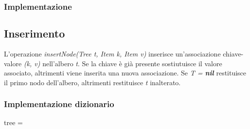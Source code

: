 \subsubsection{Implementazione}
\begin{multicols}{2}
\begin{algorithm}[H]
\DontPrintSemicolon
{}
\caption{\protect{}}
\end{algorithm}
\columnbreak
\begin{algorithm}[H]
\DontPrintSemicolon
{}
\caption{\protect{}}

\end{algorithm}
\end{multicols}
\subsection{Inserimento}
L'operazione \emph{insertNode(Tree t, Item k, Item v)} inserisce un'associazione chiave-valore \emph{(k, v)} nell'albero \emph{t}. Se la chiave \`e gi\`a 
presente sostiutuisce il valore associato, altrimenti viene inserita una nuova associazione. Se \emph{T = \textbf{nil}} restituisce il primo nodo
dell'albero, altrimenti restituisce \emph{t} inalterato.
\subsubsection{Implementazione dizionario}
\begin{algorithm}[H]
\DontPrintSemicolon
{}

\caption{\protect{}}
tree = \;
\end{algorithm}
